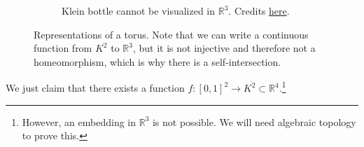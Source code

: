 \begin{example}
\begin{figure}[H]
\begin{subfigure}[b]{0.48\textwidth}
        \caption{Klein bottle cannot be visualized in $\mathbb{R}^3$. Credits \href{https://tex.stackexchange.com/questions/77606/making-a-labeled-klein-bottle-using-tikz-or-pgfplots}{here}.}
        \label{fig:klein_r3}
      \end{subfigure}
      \caption{Representations of a torus. Note that we can write a continuous function from $K^2$ to $\mathbb{R}^3$, but it is not injective and therefore not a homeomorphism, which is why there is a self-intersection. }
      \label{fig:klein}
    \end{figure}

    We just claim that there exists a function $f: [0, 1]^2 \rightarrow K^2 \subset \mathbb{R}^4$.\footnote{However, an embedding in $\mathbb{R}^3$ is not possible. We will need algebraic topology to prove this.} 
  \end{example}

